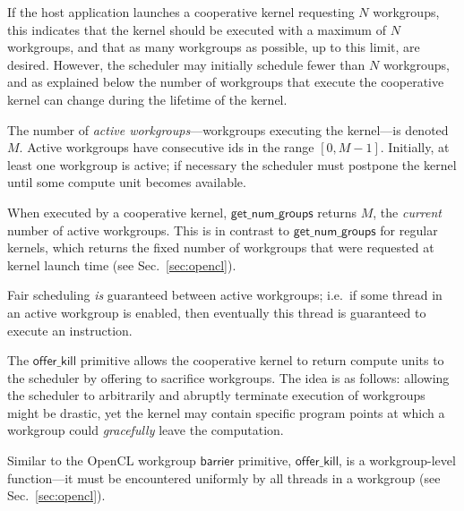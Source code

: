 \documentclass[parskip=half,sigconf,review, anonymous=true, acmcopyrightmode=none]{acmart}
\newcommand{\mysec}{Sec.~}
\newcommand{\offerkill}{\mathsf{offer\_kill}}
\newcommand{\getnumgroups}{\mathsf{get\_num\_groups}}
\begin{document}
%
If the host application launches a cooperative kernel requesting $N$
workgroups, this indicates that the kernel should be executed with a
maximum of $N$ workgroups, and that as many workgroups as possible, up
to this limit, are desired.  However, the scheduler may initially
schedule fewer than $N$ workgroups, and as explained below the number
of workgroups that execute the cooperative kernel can change during
the lifetime of the kernel.

The number of \emph{active workgroups}---workgroups executing the
kernel---is denoted $M$.  Active workgroups
have consecutive ids in the range $[0, M-1]$.
Initially, at least one workgroup is active;
if necessary the scheduler must postpone the kernel until
some compute unit becomes available.

When executed by a cooperative
kernel, $\getnumgroups$ returns $M$, the \emph{current} number of
active workgroups.  This is in contrast to $\getnumgroups$ for
regular kernels, which returns the fixed number of workgroups that
were requested at kernel launch time (see \mysec\ref{sec:opencl}).

Fair scheduling \emph{is} guaranteed between active workgroups;
i.e.\ if some thread in an active workgroup is enabled, then
eventually this thread is guaranteed to execute an instruction.


\myparagraph{Semantics for $\offerkill$}
%
The $\offerkill$ primitive allows the cooperative kernel to return
compute units to the scheduler by offering to sacrifice workgroups.
The idea is as follows: allowing the scheduler to arbitrarily and abruptly terminate execution
of workgroups might be drastic, yet the kernel
may contain specific program points at which a workgroup could
\emph{gracefully} leave the computation.

Similar to the OpenCL workgroup $\mathsf{barrier}$ primitive,
$\offerkill$, is a workgroup-level function---it must be encountered
uniformly by all threads in a workgroup (see
\mysec\ref{sec:opencl}).
\end{document}
